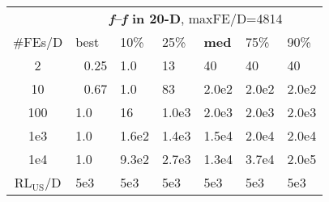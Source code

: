 \begin{tabular}{c|llllll}
 & \multicolumn{6}{|c}{\textbf{\textit{f}\raisebox{-0.35ex}{1}--\textit{f}\raisebox{-0.35ex}{24} in 20-D}, maxFE/D=4814}\\
\#FEs/D & best & 10\% & 25\% & \textbf{med} & 75\% & 90\%\\
2 & ~\,0.25 & \hspace*{1ex}1.0 & 13 & 40 & 40 & 40\\
10 & ~\,0.67 & \hspace*{1ex}1.0 & 83 & 2.0e2 & 2.0e2 & 2.0e2\\
100 & \hspace*{1ex}1.0 & 16 & 1.0e3 & 2.0e3 & 2.0e3 & 2.0e3\\
1e3 & \hspace*{1ex}1.0 & 1.6e2 & 1.4e3 & 1.5e4 & 2.0e4 & 2.0e4\\
1e4 & \hspace*{1ex}1.0 & 9.3e2 & 2.7e3 & 1.3e4 & 3.7e4 & 2.0e5\\
$\text{RL}_{\text{US}}$/D & 5e3 & 5e3 & 5e3 & 5e3 & 5e3 & 5e3
\end{tabular}
